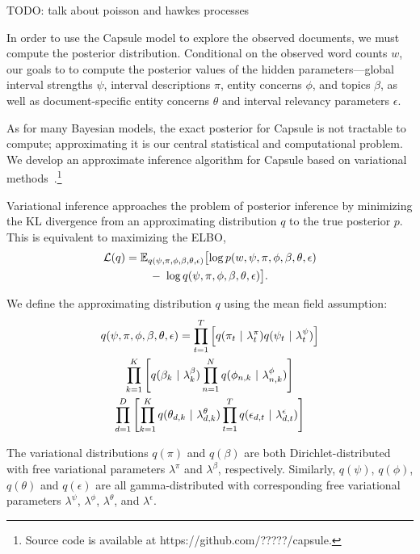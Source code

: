 TODO: talk about poisson and hawkes processes

In order to use the Capsule model to explore the observed documents, we must compute the posterior distribution.  Conditional on the observed word counts $w$, our goals to to compute the posterior values of the hidden parameters---global interval strengths $\psi$, interval descriptions $\pi$, entity concerns $\phi$, and topics $\beta$, as well as document-specific entity concerns $\theta$ and interval relevancy parameters $\epsilon$.

As for many Bayesian models, the exact posterior for Capsule is not tractable to compute; approximating it is our central statistical and computational problem.  We develop an approximate inference algorithm for Capsule based on variational methods~\cite{Wainwright:2008}.\footnote{Source code is available at https://github.com/?????/capsule.}

Variational inference approaches the problem of posterior inference by minimizing the KL divergence from an approximating distribution $q$ to the true posterior $p$.
This is equivalent to maximizing the ELBO,
\begin{multline}
	\mathcal{L}(q)  = \mathbb{E}_{q(\psi, \pi, \phi, \beta, \theta, \epsilon)}\bigl[\log p(w, \psi, \pi, \phi, \beta, \theta, \epsilon) \\
	-~\log q(\psi, \pi, \phi, \beta, \theta, \epsilon)\bigr].
	\label{eq:elbo}
\end{multline}

We define the approximating distribution $q$ using the mean field assumption:
\begin{multline}
	q(\psi, \pi, \phi, \beta, \theta, \epsilon) = \prod_{t=1}^T \left[ q(\pi_{t} ~\vert~ \lambda^\pi_t) q(\psi_t ~\vert~ \lambda^\psi_t) \right] \\
		\prod_{k=1}^K \left[ q(\beta_{k} ~\vert~ \lambda^\beta_k) \prod_{n=1}^N q(\phi_{n,k} ~\vert~ \lambda^\phi_{n,k}) \right] \\
		\prod_{d=1}^D \left[
				\prod_{k=1}^K q(\theta_{d,k} ~\vert~ \lambda^\theta_{d,k})
				\prod_{t=1}^T q(\epsilon_{d,t} ~\vert~ \lambda^\epsilon_{d,t})
			\right]
	\label{eq:q}
\end{multline}

The variational distributions $q(\pi)$ and $q(\beta)$ are both Dirichlet-distributed with free variational parameters $\lambda^\pi$ and $\lambda^\beta$, respectively.  Similarly, $q(\psi)$, $q(\phi)$, $q(\theta)$ and $q(\epsilon)$ are all gamma-distributed with corresponding free variational parameters $\lambda^\psi$, $\lambda^\phi$, $\lambda^\theta$, and $\lambda^\epsilon$.

